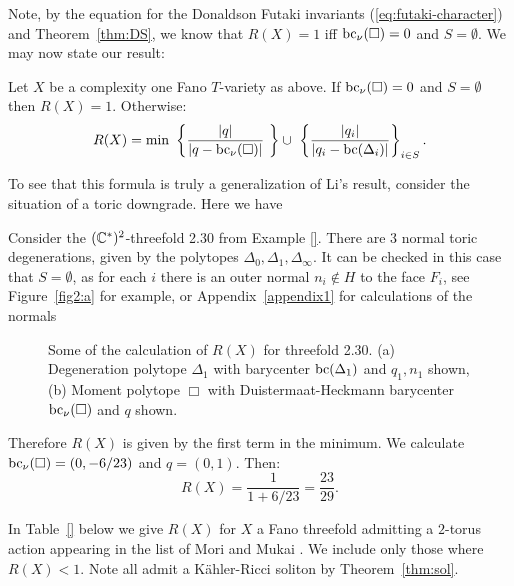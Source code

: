Note, by the equation for the Donaldson Futaki invariants (\ref{eq:futaki-character}) and Theorem~\ref{thm:DS}, we know that \(R(X) = 1\) iff \(\mathop{\rm bc}\nolimits_\nu(\Box) = 0\) and \(S = \emptyset\). We may now state our result:

\begin{theorem} \label{thm:R(X)} Let \(X\) be a complexity one Fano \(T\)-variety as above. If \(\mathop{\rm bc}\nolimits_\nu(\Box) = 0\) and \(S = \emptyset\) then \(R(X) = 1\). Otherwise:
\[
R(X) = \min \  \left\lbrace \frac{|q|}{|q-\mathop{\rm bc}\nolimits_\nu(\Box)|}  \ \right\rbrace \cup \ \left\lbrace \frac{|q_i|}{|q_i - \mathop{\rm bc}\nolimits(\Delta_i)|} \right\rbrace_{i \in S} .
\]
\end{theorem}
\begin{remark}
To see that this formula is truly a generalization of Li's result, consider the situation of a toric downgrade. Here we have 
\end{remark}
\begin{example}
Consider the \((\mathbb{C}^*)^2\)-threefold 2.30 from Example \ref{}. There are \(3\) normal toric degenerations, given by the polytopes \(\Delta_{0},\Delta_1,\Delta_{\infty}\). It can be checked in this case that \(S = \emptyset\), as for each \(i\) there is an outer normal \(n_i \not\in H\) to the face \(F_i\), see Figure~\ref{fig2:a} for example, or Appendix~\ref{appendix1} for calculations of the normals
\begin{figure}[H]
	\subcaptionbox{\label{fig2:a}}{\degendiagram}\hfill%
	\subcaptionbox{\label{fig2:b}}{\momentdiagram}%
	\caption{Some of the calculation of $R(X)$ for threefold 2.30. (a) Degeneration polytope $\Delta_1$ with barycenter $\mathop{\rm bc}\nolimits(\Delta_1)$ and $q_1,n_1$ shown, (b) Moment polytope $\Box$ with Duistermaat-Heckmann barycenter $\mathop{\rm bc}\nolimits_\nu(\Box)$ and $q$ shown.}
\end{figure}
Therefore \(R(X)\) is given by the first term in the minimum. We calculate \(\mathop{\rm bc}\nolimits_\nu(\Box)= (0,-6/23)\) and \(q = (0,1)\). Then:
\[
R(X) = \frac{1}{1+ 6/23} = \frac{23}{29}.
\]
\end{example}
\begin{corollary} \label{cor:R(X)}
In Table~\ref{} below we give \(R(X)\) for \(X\) a Fano threefold  admitting a \(2\)-torus action appearing in the list of Mori and Mukai \cite{mori1981classification}. We include only those where \(R(X) <1\). Note all admit a K\"ahler-Ricci soliton by Theorem~\ref{thm:sol}.
\end{corollary}
